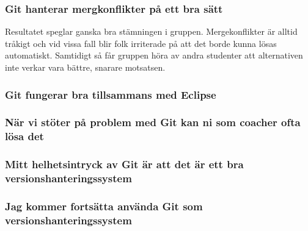\subsubsection{Git hanterar mergkonflikter på ett bra sätt}
Resultatet speglar ganska bra stämningen i gruppen. Mergekonflikter är alltid tråkigt och vid vissa fall blir folk irriterade på att det borde kunna lösas automatiskt. Samtidigt så får gruppen höra av andra studenter att alternativen inte verkar vara bättre, snarare motsatsen.  

\subsubsection{Git fungerar bra tillsammans med Eclipse}


\subsubsection{När vi stöter på problem med Git kan ni som coacher ofta lösa det}


\subsubsection{Mitt helhetsintryck av Git är att det är ett bra versionshanteringssystem}


\subsubsection{Jag kommer fortsätta använda Git som versionshanteringssystem}

